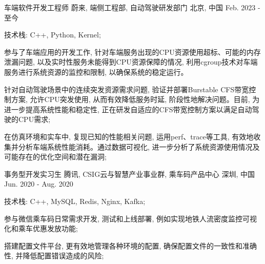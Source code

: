 

\begin{cventries}

\cventry
{车端软件开发工程师} %
{蔚来, 端侧工程部, 自动驾驶研发部门} %
{北京, 中国} %
{Feb. 2023 - 至今} %
{
  \begin{cvitems} %
    \item {技术栈: C++, Python, Kernel;}
    \item {参与了车端应用的开发工作, 针对车端服务出现的CPU资源使用超标、可能的内存泄漏问题, 以及实时性服务未能得到CPU资源保障的情况, 利用cgroup技术对车端服务进行系统资源的监控和限制, 以确保系统的稳定运行。}
    \item {针对自动驾驶场景中的连续突发资源需求问题, 验证并部署Burstable CFS带宽控制方案, 允许CPU突发使用, 从而有效降低服务时延, 阶段性地解决问题。目前, 为进一步提高系统性能和稳定性, 正在研发自适应的CFS带宽控制方案以满足自动驾驶的CPU需求;}
    \item {在仿真环境和实车中, 复现已知的性能相关问题, 运用perf、trace等工具, 有效地收集并分析车端系统性能消耗。通过数据可视化, 进一步分析了系统资源使用情况及可能存在的优化空间和潜在漏洞;}
  \end{cvitems}
}

  \cventry
    {事务型开发实习生} %
    {腾讯, CSIG云与智慧产业事业群, 乘车码产品中心} %
    {深圳, 中国} %
    {Jun. 2020 - Aug. 2020} %
    {
      \begin{cvitems} %
        \item {技术栈: C++, MySQL, Redis, Nginx, Kafka;}
        \item {参与微信乘车码日常需求开发, 测试和上线部署, 例如实现地铁人流密度监控可视化和乘车优惠发放功能;}
        \item {搭建配置文件平台, 更有效地管理各种环境的配置, 确保配置文件的一致性和准确性, 并降低配置错误造成的风险;}
      \end{cvitems}
    }


\end{cventries}
